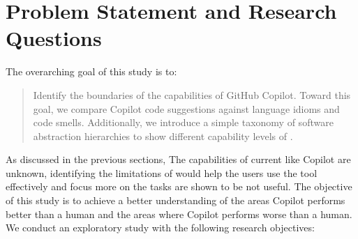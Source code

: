 \section{Problem Statement and Research Questions}
The overarching goal of this study is to:
\begin{quote}
    Identify the boundaries of the capabilities of GitHub Copilot. Toward this goal, we compare Copilot code suggestions against language idioms and code smells. Additionally, we introduce a simple taxonomy of software abstraction hierarchies to show different capability levels of \cct{}. 
\end{quote}

As discussed in the previous sections, The capabilities of current \cct{} like Copilot are unknown, identifying the limitations of \cct{} would help the users use the tool effectively and focus more on the tasks \cct{} are shown to be not useful. The objective of this study is to achieve a better understanding of the areas Copilot performs better than a human and the areas where Copilot performs worse than a human. We conduct an exploratory study with the following research objectives:

